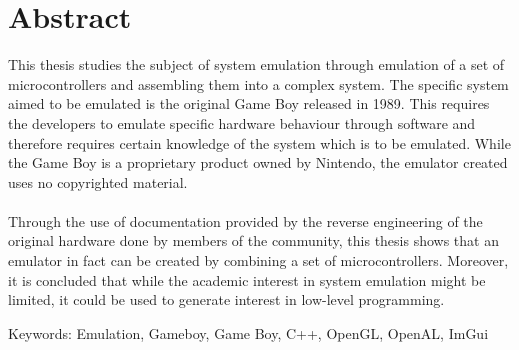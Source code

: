 
\thispagestyle{plain}			%
\setlength{\parskip}{0pt plus 1.0pt}
\section*{\centering Abstract}
This thesis studies the subject of system emulation through emulation of a set of microcontrollers and assembling them into a complex system. The specific system aimed to be emulated is the original Game Boy released in 1989. This requires the developers to emulate specific hardware behaviour through software and therefore requires certain knowledge of the system which is to be emulated. While the Game Boy is a proprietary product owned by Nintendo, the emulator created uses no copyrighted material. %
\\\\
Through the use of documentation provided by the reverse engineering of the original hardware done by members of the community, this thesis shows that an emulator in fact can be created by combining a set of microcontrollers. Moreover, it is concluded that while the academic interest in system emulation might be limited, it could be used to generate interest in low-level programming.

\vfill
Keywords: Emulation, Gameboy, Game Boy, C++, OpenGL, OpenAL, ImGui

\newpage				%
\thispagestyle{plain}
\mbox{}


